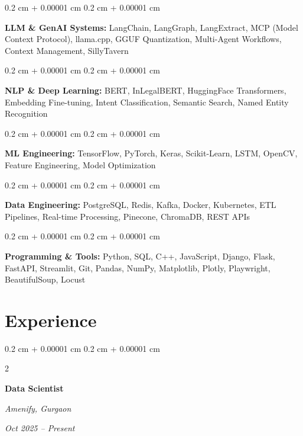 \documentclass[10pt, letterpaper]{article}
\newenvironment{onecolentry}{
    \begin{adjustwidth}{
        0.2 cm + 0.00001 cm
    }{
        0.2 cm + 0.00001 cm
    }
}{
    \end{adjustwidth}
}
\newenvironment{twocolentry}[2][]{
    \onecolentry
    \def\secondColumn{#2}
    \setcolumnwidth{\fill, 4.5 cm}
    \begin{paracol}{2}
}{
    \switchcolumn \raggedleft \secondColumn
    \end{paracol}
    \endonecolentry
}
\begin{document}
    \begin{onecolentry}
        \textbf{LLM \& GenAI Systems:} LangChain, LangGraph, LangExtract, MCP (Model Context Protocol), llama.cpp, GGUF Quantization, Multi-Agent Workflows, Context Management, SillyTavern
    \end{onecolentry}
    
    \vspace{0.2 cm}

    \begin{onecolentry}
        \textbf{NLP \& Deep Learning:} BERT, InLegalBERT, HuggingFace Transformers, Embedding Fine-tuning, Intent Classification, Semantic Search, Named Entity Recognition
    \end{onecolentry}
    
    \vspace{0.2 cm}
    
    \begin{onecolentry}
        \textbf{ML Engineering:} TensorFlow, PyTorch, Keras, Scikit-Learn, LSTM, OpenCV, Feature Engineering, Model Optimization
    \end{onecolentry}
    
    \vspace{0.1 cm}

    \begin{onecolentry}
        \textbf{Data Engineering:} PostgreSQL, Redis, Kafka, Docker, Kubernetes, ETL Pipelines, Real-time Processing, Pinecone, ChromaDB, REST APIs
    \end{onecolentry}
    
    \vspace{0.1 cm}
    
    \begin{onecolentry}
        \textbf{Programming \& Tools:} Python, SQL, C++, JavaScript, Django, Flask, FastAPI, Streamlit, Git, Pandas, NumPy, Matplotlib, Plotly, Playwright, BeautifulSoup, Locust
    \end{onecolentry}
\vspace{0.3 cm}
    \section{Experience}

        \vspace{0.2 cm}

        \begin{twocolentry}{\textit{Oct 2025 – Present}}
            \textbf{Data Scientist}
            
            \textit{Amenify, Gurgaon}
        \end{twocolentry}
        
\end{document}
